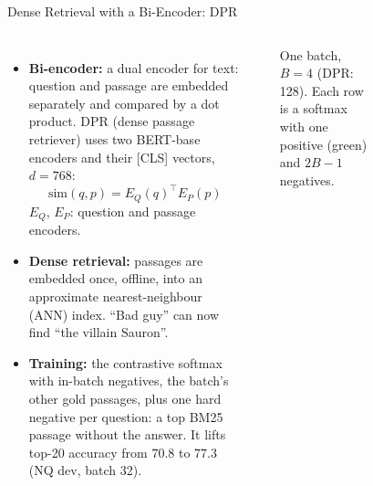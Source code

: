 \begin{frame}{Dense Retrieval with a Bi-Encoder: DPR}
  \begin{columns}[T,onlytextwidth]
      \begin{itemize}\footnotesize\itemsep0.3em
        \item[\textcolor{red}{$\blacktriangleright$}] \textbf{Bi-encoder:} a dual encoder for text: question and passage are embedded separately and compared by a dot product. DPR (dense passage retriever) uses two BERT-base encoders and their [CLS] vectors, $d = 768$:
          \[ \text{sim}(q,p) = E_Q(q)^{\top} E_P(p) \]
          {\scriptsize $E_Q$, $E_P$: question and passage encoders.}
        \item[\textcolor{red}{$\blacktriangleright$}] \textbf{Dense retrieval:} passages are embedded once, offline, into an approximate nearest-neighbour (ANN) index. ``Bad guy'' can now find ``the villain Sauron''.
        \item[\textcolor{red}{$\blacktriangleright$}] \textbf{Training:} the contrastive softmax with in-batch negatives, the batch's other gold passages, plus one hard negative per question: a top BM25 passage without the answer. It lifts top-20 accuracy from 70.8 to 77.3 (NQ dev, batch 32).
      \end{itemize}
      {\centering
      \\[0.2em]
      {\scriptsize One batch, $B = 4$ (DPR: 128). Each row is a softmax with one positive (green) and $2B - 1$ negatives.\par}\vspace{0.4em}
      {\scriptsize
      \begin{tabular}{lcc}

\end{tabular}}}
\end{columns}
\end{frame}
